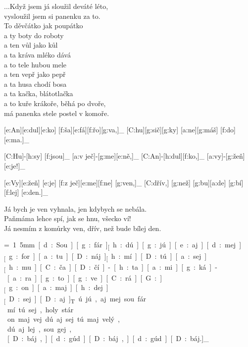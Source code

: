 %
%
%
%
%
%
%
%

...Když jsem já sloužil deváté léto, \\
vysloužil jsem si panenku za to. \\
To děvčátko jak poupátko \\
a ty boty do roboty \\
a ten vůl jako kůl \\
a ta kráva mléko dává \\
a to tele hubou mele \\
a ten vepř jako pepř \\
a ta husa chodí bosa \\
a ta kačka, blátotlačka \\
a to kuře krákoře, běhá po dvoře, \\
má panenka stele postel v komoře.



[e:An][e:dul][e:ko] [f:ša][e:fá][f:řo][g:va,]_
[C:hu][g:sič][g:ky] [a:ne][g:máš] [f:do][e:ma.]_

[C:Hu]-[h:sy] [f:jsou]_ [a:v ječ]-[g:me][e:ně,]_
[C:An]-[h:dul][f:ko,]_ [a:vy]-[g:žeň] [e:je!]_

[e:Vy][e:žeň] [e:je] [f:z ječ][e:me][f:ne] [g:ven,]_
[C:dřív,] [g:než] [g:bu][a:de] [g:bí][f:lej] [e:den.]_

Já bych je ven vyhnala, jen kdybych se nebála. \\
Paňmáma lehce spí, jak se hnu, všecko ví! \\
Já nesmím z komůrky ven, dřív, než bude bílej den.



{\unit=1.5mm
[d:Sou] [g:fár]_ [h:dú] [g:jú] [e:aj] [d:mej]_
[g:for][a:tu][D:náj]_ [h:mí] [D:tú] [a:sej]_

[h:mu][C:ča][D:čí]-[h:ta] [a:mi] [g:ká]-[a:ra] [g:to] [g:ve][C:rá][G:]_

[g:on] [a:maj] [h:dej]_ [D:sej] [D:aj]_

Tú jú, aj mej sou fár \\
mí tú sej, holy stár \\
on maj vej dú aj sej tú maj velý, \\
dú aj lej, sou gej, \\
[d:gúd][D:báj,] [d:gúd][D:báj,] [d:gúd][D:báj.]_
}


